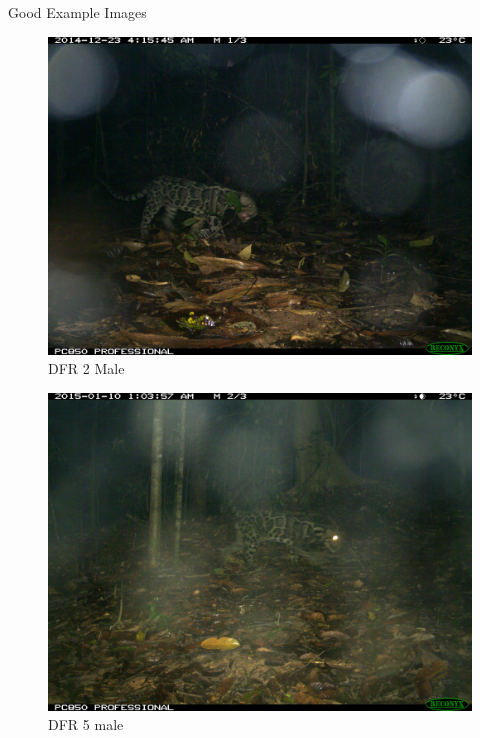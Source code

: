 \documentclass[10pt]{beamer}
\begin{document}

\begin{frame}{Good Example Images}		
	\centering
	\begin{minipage}[c]{0.48\linewidth}
		\begin{figure}
			\includegraphics[width=\linewidth,height=\textheight,keepaspectratio]{images/example_DFR_2_male.JPG}
			\caption{DFR 2 Male}
		\end{figure}
	\end{minipage}
	\hfill
	\begin{minipage}[c]{0.48\linewidth}
		\begin{figure}
			\includegraphics[width=\linewidth,height=.8\textheight,keepaspectratio]{images/example_DFR_5_male.JPG}
			\caption{DFR 5 male}
		\end{figure}
	\end{minipage}
\end{frame}
\end{document}
